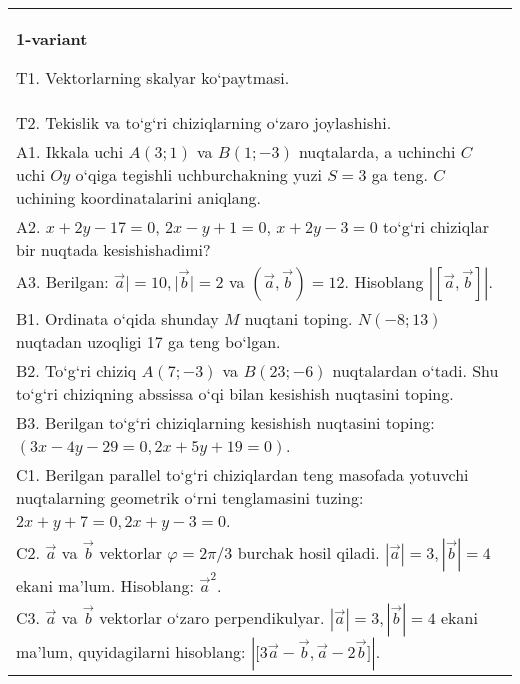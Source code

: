 \documentclass{article}
\begin{document}


\begin{tabular}{m{17cm}}
\textbf{1-variant}

T1. 
Vektorlarning skalyar ko‘paytmasi.
 \\
T2. 
Tekislik va to‘g‘ri chiziqlarning o‘zaro joylashishi.
 \\
A1. 
Ikkala uchi $A (3;1) $ va $B (1;-3) $ nuqtalarda, a
uchinchi $C$ uchi $Oy$ o‘qiga tegishli uchburchakning
yuzi $S=3$ ga teng. $C$ uchining koordinatalarini aniqlang.
 \\
A2. 
$x+2y-17=0$, $2x-y+1=0$, $x+2y-3=0$
to‘g‘ri chiziqlar bir nuqtada kesishishadimi?
 \\
A3. 
Berilgan: $\overrightarrow{a}| = 10,|\overrightarrow{b}| = 2$ va
$\left(\overrightarrow{a},\overrightarrow{b} \right) = 12$. Hisoblang
$\left| \left\lbrack \overrightarrow{a},\overrightarrow{b} \right\rbrack \right|$.
 \\
B1. 
Ordinata o‘qida shunday $M$ nuqtani toping.
\(N (-8;13) \) nuqtadan uzoqligi 17 ga teng bo‘lgan.
 \\
B2. 
To‘g‘ri chiziq \(A (7;-3) \) va \(B (23;-6) \) nuqtalardan o‘tadi.
Shu to‘g‘ri chiziqning abssissa o‘qi bilan kesishish nuqtasini toping.
 \\
B3. 
Berilgan to‘g‘ri chiziqlarning kesishish nuqtasini toping:
$(3x-4y-29=0, 2x+5y+19=0)$.
 \\
C1. 
Berilgan parallel to‘g‘ri chiziqlardan teng masofada yotuvchi
nuqtalarning geometrik o‘rni tenglamasini tuzing: $2x+y+7=0, 2x+y-3=0$.
 \\
C2. 
$\vec{a}$ va $\vec{b}$ vektorlar $\varphi = 2\pi/3$ burchak hosil qiladi. $|\vec{a}| = 3,|\vec{b}| = 4$ ekani ma’lum. Hisoblang:
${\vec{a}}^{2}$.
 \\
C3. 
$\vec{a}$ va $\vec{b}$ vektorlar o‘zaro perpendikulyar. $|\vec{a}| = 3,|\vec{b}| = 4$ ekani ma’lum, quyidagilarni hisoblang:
$|\lbrack 3\vec{a} - \vec{b},\vec{a}-2\vec{b}\rbrack|$.
 \\

\end{tabular}
\vspace{1cm}
\end{document}

